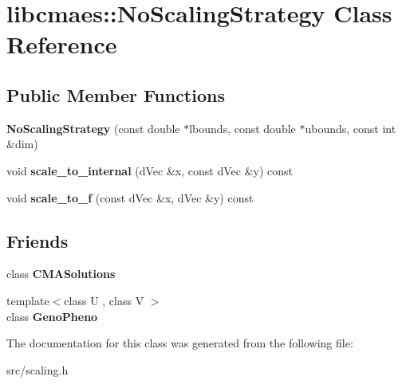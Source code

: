 \hypertarget{classlibcmaes_1_1NoScalingStrategy}{\section{libcmaes\-:\-:No\-Scaling\-Strategy Class Reference}
\label{classlibcmaes_1_1NoScalingStrategy}
}
\subsection*{Public Member Functions}
\begin{DoxyCompactItemize}
\item 
\hypertarget{classlibcmaes_1_1NoScalingStrategy_afa32ee30796e0daa71dacf0b39a24038}{{\bfseries No\-Scaling\-Strategy} (const double $\ast$lbounds, const double $\ast$ubounds, const int \&dim)}\label{classlibcmaes_1_1NoScalingStrategy_afa32ee30796e0daa71dacf0b39a24038}

\item 
\hypertarget{classlibcmaes_1_1NoScalingStrategy_a2cec97ec77df54410a5218d0fa24913c}{void {\bfseries scale\-\_\-to\-\_\-internal} (d\-Vec \&x, const d\-Vec \&y) const }\label{classlibcmaes_1_1NoScalingStrategy_a2cec97ec77df54410a5218d0fa24913c}

\item 
\hypertarget{classlibcmaes_1_1NoScalingStrategy_ae7c21e6a62a97a9fe4426923440750fc}{void {\bfseries scale\-\_\-to\-\_\-f} (const d\-Vec \&x, d\-Vec \&y) const }\label{classlibcmaes_1_1NoScalingStrategy_ae7c21e6a62a97a9fe4426923440750fc}

\end{DoxyCompactItemize}
\subsection*{Friends}
\begin{DoxyCompactItemize}
\item 
\hypertarget{classlibcmaes_1_1NoScalingStrategy_a78b1b9910ebce544de9b54b998e77879}{class {\bfseries C\-M\-A\-Solutions}}\label{classlibcmaes_1_1NoScalingStrategy_a78b1b9910ebce544de9b54b998e77879}

\item 
\hypertarget{classlibcmaes_1_1NoScalingStrategy_a30b6df18a1c8899440f1ca1273b26bb9}{{\footnotesize template$<$class U , class V $>$ }\\class {\bfseries Geno\-Pheno}}\label{classlibcmaes_1_1NoScalingStrategy_a30b6df18a1c8899440f1ca1273b26bb9}

\end{DoxyCompactItemize}


The documentation for this class was generated from the following file\-:\begin{DoxyCompactItemize}
\item 
src/scaling.\-h\end{DoxyCompactItemize}

